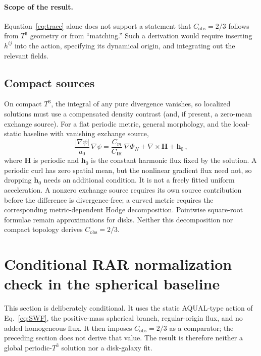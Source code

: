 \documentclass[aps,prd,reprint,superscriptaddress,nofootinbib,floatfix,showkeys]{revtex4-2}
\newcommand{\Tthree}{T^{3}}
\newcommand{\Cobs}{C_{\mathrm{obs}}}
\newcommand{\Cm}{C_{m}}
\newcommand{\CIR}{C_{\mathrm{IR}}}
\newcommand{\azero}{a_{0}}
\begin{document}
\paragraph{Scope of the result.}
Equation~\eqref{eq:trace} alone does not support a statement that
\(\Cobs=2/3\) follows from \(\Tthree\) geometry or from ``matching.''  Such a
derivation would require inserting \(h^{ij}\) into the action, specifying its
dynamical origin, and integrating out the relevant fields.

\subsection{Compact sources}

On compact \(\Tthree\), the integral of any pure divergence vanishes, so
localized solutions must use a compensated density contrast (and, if present,
a zero-mean exchange source).  For a flat periodic metric, general morphology,
and the local-static baseline with vanishing exchange source,
\begin{equation}
  \frac{|\nabla\psi|}{\azero}\,\nabla\psi
  = \frac{\Cm}{\CIR}\,\nabla\Phi_{N} + \nabla\times\mathbf{H}
    + \mathbf{h}_0\,,
  \label{eq:curl}
\end{equation}
where \(\mathbf H\) is periodic and \(\mathbf h_0\) is the constant harmonic
flux fixed by the solution.  A periodic curl has zero spatial mean, but the
nonlinear gradient flux need not, so dropping \(\mathbf h_0\) needs an
additional condition.  It is not a freely fitted uniform acceleration.
A nonzero exchange source requires its own source contribution before the
difference is divergence-free; a curved metric requires the corresponding
metric-dependent Hodge decomposition.  Pointwise square-root formulae remain
approximations for disks.  Neither this decomposition nor compact topology
derives \(\Cobs=2/3\).

\section{Conditional RAR normalization check in the spherical baseline}
\label{sec:rar}

This section is deliberately conditional.  It uses the static AQUAL-type
action of Eq.~\eqref{eq:SWF}, the positive-mass spherical branch, regular-origin
flux, and no added homogeneous flux.  It then imposes \(\Cobs=2/3\) as a
comparator; the preceding section does not derive that value.  The result is
therefore neither a global periodic-\(\Tthree\) solution nor a disk-galaxy fit.
\end{document}
